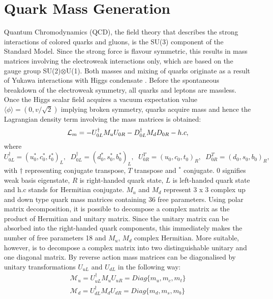 \section{Quark Mass Generation}
Quantum Chromodynamics (QCD), the field theory that describes the strong interactions of colored quarks and gluons, is the SU(3) component of the Standard Model. Since the strong force is flavour symmetric, this results in mass matrices involving the electroweak interactions only, which are based on the gauge group SU(2)$\otimes$U(1). Both masses and mixing of quarks originate as a result of Yukawa interactions with Higgs condensate \cite{ewconstraint}. Before the spontaneous breakdown of the electroweak symmetry, all quarks and leptons are massless. Once the Higgs scalar field acquires a vacuum expectation value $\langle\phi\rangle = (0, v/\sqrt{2})$ implying broken symmetry, quarks acquire mass and hence the Lagrangian density term involving the mass matrices\cite{texture} is obtained: 
\begin{equation}\label{lama}
{\cal L}_m= -U_{0L}^{\dagger}M_u U_{0R} - D_{0L}^{\dagger}M_dD_{0R} - h.c,
\end{equation}
where $U_{0L}^{\dagger}=(u_0^{*}, c_0^{*}, t_0^{*})_L,\;\; D_{0L}^{\dagger}=(d_0^{*},s_0^{*}, b_0^{*})_L,\;\; U_{0R}^T=(u_0,c_0,t_0)_R,\;\;D_{0R}^T=(d_0,s_0,b_0)_R,$ with $\dagger$ representing conjugate transpose, $T$ transpose and $^{*}$ conjugate. $0$ signifies weak basis eigenstate, $R$ is right-handed quark state, $L$ is left-handed quark state and h.c stands for Hermitian conjugate. $M_{u}$ and $M_{d}$ represent 3 x 3 complex up and down type quark mass matrices containing 36 free parameters. Using polar matrix decomposition, it is possible to decompose  a complex matrix as the product of Hermitian and unitary matrix. Since the unitary matrix can be absorbed into the right-handed quark components, this immediately makes the number of free parameters 18 and $M_{u}$, $M_{d}$  complex Hermitian.
\newline
\indent More suitable, however, is to decompose a complex matrix into two distinguishable unitary and one diagonal matrix. By reverse action mass matrices can be diagonalised by unitary transformations $U_{uL}$ and $ U_{dL}$ in the following way:
\begin{equation}
\begin{split}
\mathcal{M}_{u} = U_{uL}^{\dagger}M_{u}U_{uR} = Diag\{m_{u},m_{c},m_{t}\}
\\
\mathcal{M}_{d} = U_{dL}^{\dagger}M_{d}U_{dR} = Diag\{m_{d},m_{s},m_{b}\}
\end{split}
\end{equation}
